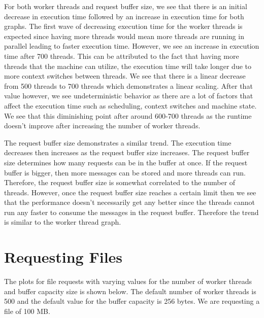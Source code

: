 \documentclass[12pt]{article}
\begin{document}
For both worker threads and request buffer size, we see that there is an initial decrease in execution time followed by an increase in execution time for both graphs. The first wave of decreasing execution time for the worker threads is expected since having more threads would mean more threads are running in parallel leading to faster execution time. However, we see an increase in execution time after 700 threads. This can be attributed to the fact that having more threads that the machine can utilize, the execution time will take longer due to more context switches between threads. We see that there is a linear decrease from 500 threads to 700 threads which demonstrates a linear scaling. After that value however, we see undeterministic behavior as there are a lot of factors that affect the execution time such as scheduling, context switches and machine state. We see that this diminishing point after around 600-700 threads as the runtime doesn't improve after increasing the number of worker threads. 

The request buffer size demonstrates a similar trend. The execution time decreases then increases as the request buffer size increases. The request buffer size determines how many requests can be in the buffer at once. If the request buffer is bigger, then more messages can be stored and more threads can run. Therefore, the request buffer size is somewhat correlated to the number of threads. However, once the request buffer size reaches a certain limit then we see that the performance doesn't necessarily get any better since the threads cannot run any faster to consume the messages in the request buffer. Therefore the trend is similar to the worker thread graph. 

\section{Requesting Files}

The plots for file requests with varying values for the number of worker threads and buffer capacity size is shown below. The default number of worker threads is 500 and the default value for the buffer capacity is 256 bytes. We are requesting a file of 100 MB. 
\end{document}
